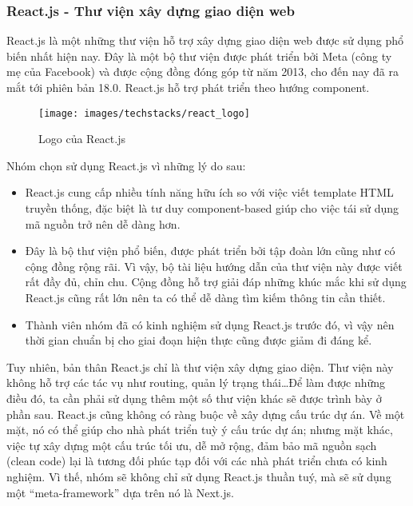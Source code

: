 \documentclass[../main.tex]{subfiles}
\begin{document}
	\subsubsection{React.js - Thư viện xây dựng giao diện web}

	React.js là một những thư viện hỗ trợ xây dựng giao diện web được sử dụng phổ biến nhất hiện nay. Đây là một bộ thư
	viện được phát triển bởi Meta (công ty mẹ của Facebook) và được cộng đồng đóng góp từ năm 2013, cho đến nay đã ra mắt
	tới phiên bản 18.0. React.js hỗ trợ phát triển theo hướng component.

	\begin{figure}[ht]
		\centering
		\texttt{[image: images/techstacks/react\_logo]}
		\caption{Logo của React.js}
		\label{fig:react-logo}
	\end{figure}

	Nhóm chọn sử dụng React.js vì những lý do sau:

	\begin{itemize}
		\item React.js cung cấp nhiều tính năng hữu ích so với việc viết template HTML truyền thống, đặc biệt là tư duy
		component-based giúp cho việc tái sử dụng mã nguồn trở nên dễ dàng hơn.
		\item Đây là bộ thư viện phổ biến, được phát triển bởi tập đoàn lớn cũng như có cộng đồng rộng rãi. Vì vậy, bộ tài
		liệu hướng dẫn của thư viện này được viết rất đầy đủ, chỉn chu. Cộng đồng hỗ trợ giải đáp những khúc mắc khi sử
		dụng React.js cũng rất lớn nên ta có thể dễ dàng tìm kiếm thông tin cần thiết.
		\item Thành viên nhóm đã có kinh nghiệm sử dụng React.js trước đó, vì vậy nên thời gian chuẩn bị cho giai đoạn hiện
		thực cũng được giảm đi đáng kể.
	\end{itemize}

	Tuy nhiên, bản thân React.js chỉ là thư viện xây dựng giao diện. Thư viện này không hỗ trợ các tác vụ như routing,
	quản lý trạng thái\ldots Để làm được những điều đó, ta cần phải sử dụng thêm một số thư viện khác sẽ được trình bày ở
	phần sau. React.js cũng không có ràng buộc về xây dựng cấu trúc dự án. Về một mặt, nó có thể giúp cho nhà phát triển
	tuỳ ý cấu trúc dự án; nhưng mặt khác, việc tự xây dựng một cấu trúc tối ưu, dễ mở rộng, đảm bảo mã nguồn sạch (clean
	code) lại là tương đối phúc tạp đối với các nhà phát triển chưa có kinh nghiệm. Vì thế, nhóm sẽ không chỉ sử dụng
	React.js thuần tuý, mà sẽ sử dụng một ``meta-\Gls{framework}'' dựa trên nó là Next.js.
\end{document}
